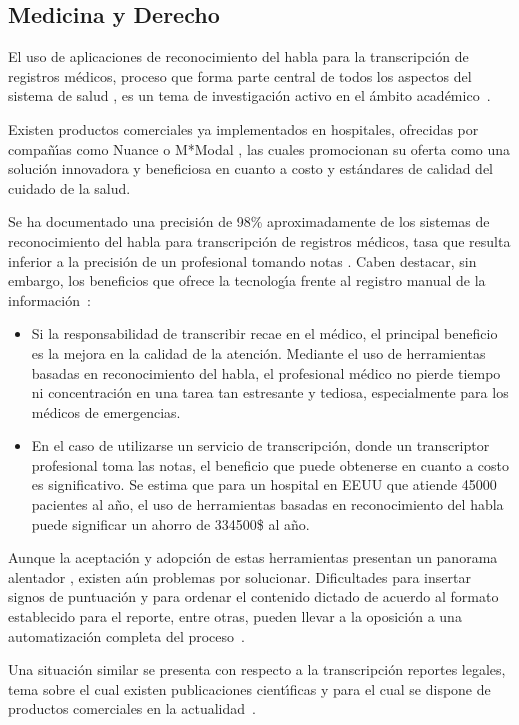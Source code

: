 \subsection{Medicina y Derecho}
\label{sec:medicina}

El uso de aplicaciones de reconocimiento del habla para la transcripci\'on de registros m\'edicos, proceso que forma parte central
de todos los aspectos del sistema de salud \cite{DavidListening2009}, es un tema de investigaci\'on activo en el \'ambito 
\mbox{acad\'emico \cite{LaiMedSpeak1997, HappeCombining2002}}.

Existen productos comerciales ya implementados en hospitales, ofrecidas por compa\~n{\'\i}as como Nuance \cite{NuanceOptimizing, NuanceSpeech} 
o M*Modal \cite{MmodalSpeech}, las cuales promocionan su oferta como una soluci\'on innovadora y beneficiosa en cuanto a costo 
y est\'andares de calidad del cuidado de la salud.

Se ha documentado una precisi\'on de 98\% aproximadamente de los sistemas de reconocimiento del habla para transcripci\'on de registros
m\'edicos, tasa que resulta inferior a la precisi\'on de un profesional tomando notas \cite{DavidListening2009}. 
Caben destacar, sin embargo, los beneficios que ofrece la tecnolog{\'\i}a frente al registro manual de 
la \mbox{informaci\'on \cite{ZickVoice2001}}:

\begin{itemize}
	\item Si la responsabilidad de transcribir recae en el m\'edico, el principal beneficio es la mejora en la calidad de la atenci\'on.
	Mediante el uso de herramientas basadas en reconocimiento del habla, el profesional m\'edico no pierde tiempo ni concentraci\'on en
	una tarea tan estresante y tediosa, especialmente para los m\'edicos de emergencias.
	\item En el caso de utilizarse un servicio de transcripci\'on, donde un transcriptor profesional toma las notas, el beneficio que
	puede obtenerse en cuanto a costo es significativo. Se estima que para un hospital en EEUU que atiende 45000 pacientes al a\~no,
	el uso de herramientas basadas en reconocimiento del habla puede significar un ahorro de 334500\$ al a\~no.
\end{itemize}

Aunque la aceptaci\'on y adopci\'on de estas herramientas presentan un panorama alentador \cite{GrassoLong2003}, 
existen a\'un problemas por solucionar. Dificultades para insertar signos de puntuaci\'on y para ordenar el contenido dictado
de acuerdo al formato establecido para el reporte, entre otras, pueden llevar a la oposici\'on a una automatizaci\'on 
completa del \mbox{proceso \cite{DavidListening2009}}.

Una situaci\'on similar se presenta con respecto a la transcripci\'on reportes legales, tema sobre el cual existen publicaciones
cient{\'\i}ficas \cite{van-leeuwen2008improving, FalavignaAutomatic2009} y para el cual se dispone de productos comerciales
en la \mbox{actualidad \cite{NuanceLegal}}.
